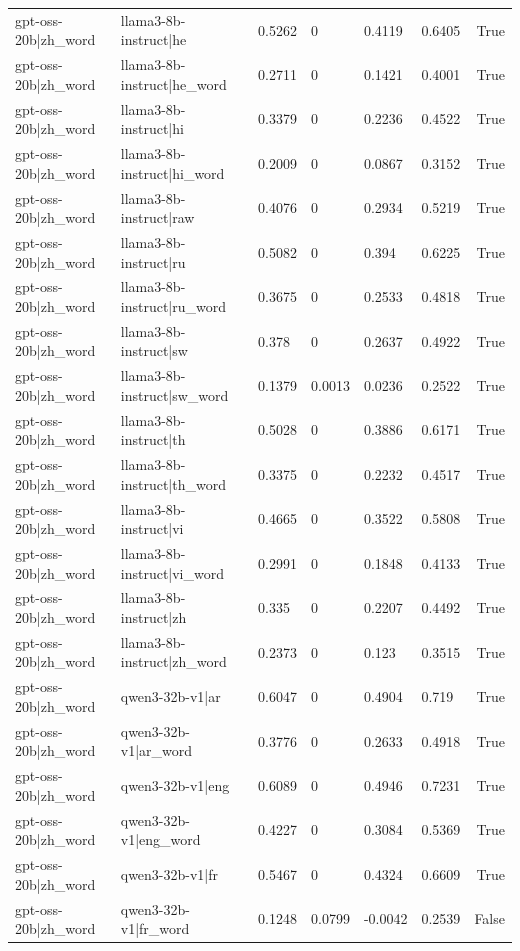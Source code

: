 \begin{table}
\begin{tabular}{llllllr}
gpt-oss-20b|zh_word & llama3-8b-instruct|he & 0.5262 & 0 & 0.4119 & 0.6405 & True \\
gpt-oss-20b|zh_word & llama3-8b-instruct|he_word & 0.2711 & 0 & 0.1421 & 0.4001 & True \\
gpt-oss-20b|zh_word & llama3-8b-instruct|hi & 0.3379 & 0 & 0.2236 & 0.4522 & True \\
gpt-oss-20b|zh_word & llama3-8b-instruct|hi_word & 0.2009 & 0 & 0.0867 & 0.3152 & True \\
gpt-oss-20b|zh_word & llama3-8b-instruct|raw & 0.4076 & 0 & 0.2934 & 0.5219 & True \\
gpt-oss-20b|zh_word & llama3-8b-instruct|ru & 0.5082 & 0 & 0.394 & 0.6225 & True \\
gpt-oss-20b|zh_word & llama3-8b-instruct|ru_word & 0.3675 & 0 & 0.2533 & 0.4818 & True \\
gpt-oss-20b|zh_word & llama3-8b-instruct|sw & 0.378 & 0 & 0.2637 & 0.4922 & True \\
gpt-oss-20b|zh_word & llama3-8b-instruct|sw_word & 0.1379 & 0.0013 & 0.0236 & 0.2522 & True \\
gpt-oss-20b|zh_word & llama3-8b-instruct|th & 0.5028 & 0 & 0.3886 & 0.6171 & True \\
gpt-oss-20b|zh_word & llama3-8b-instruct|th_word & 0.3375 & 0 & 0.2232 & 0.4517 & True \\
gpt-oss-20b|zh_word & llama3-8b-instruct|vi & 0.4665 & 0 & 0.3522 & 0.5808 & True \\
gpt-oss-20b|zh_word & llama3-8b-instruct|vi_word & 0.2991 & 0 & 0.1848 & 0.4133 & True \\
gpt-oss-20b|zh_word & llama3-8b-instruct|zh & 0.335 & 0 & 0.2207 & 0.4492 & True \\
gpt-oss-20b|zh_word & llama3-8b-instruct|zh_word & 0.2373 & 0 & 0.123 & 0.3515 & True \\
gpt-oss-20b|zh_word & qwen3-32b-v1|ar & 0.6047 & 0 & 0.4904 & 0.719 & True \\
gpt-oss-20b|zh_word & qwen3-32b-v1|ar_word & 0.3776 & 0 & 0.2633 & 0.4918 & True \\
gpt-oss-20b|zh_word & qwen3-32b-v1|eng & 0.6089 & 0 & 0.4946 & 0.7231 & True \\
gpt-oss-20b|zh_word & qwen3-32b-v1|eng_word & 0.4227 & 0 & 0.3084 & 0.5369 & True \\
gpt-oss-20b|zh_word & qwen3-32b-v1|fr & 0.5467 & 0 & 0.4324 & 0.6609 & True \\
gpt-oss-20b|zh_word & qwen3-32b-v1|fr_word & 0.1248 & 0.0799 & -0.0042 & 0.2539 & False \\

\end{tabular}
\end{table}
